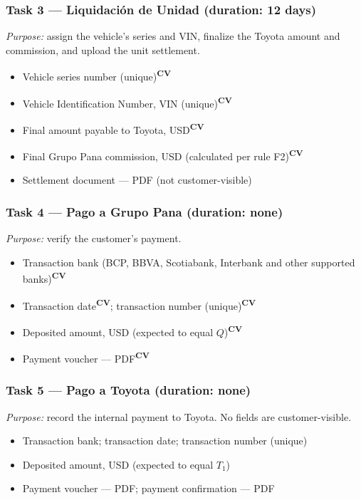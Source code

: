 \documentclass[11pt,a4paper]{article}
\newcommand{\cv}{\textsuperscript{\textcolor{panablue}{\textbf{CV}}}}
\begin{document}
\subsubsection*{Task 3 --- Liquidación de Unidad (duration: 12 days)}
\textit{Purpose:} assign the vehicle's series and VIN, finalize the Toyota
amount and commission, and upload the unit settlement.
\begin{itemize}
	\item Vehicle series number (unique)\cv{}
	\item Vehicle Identification Number, VIN (unique)\cv{}
	\item Final amount payable to Toyota, USD\cv{}
	\item Final Grupo Pana commission, USD (calculated per rule F2)\cv{}
	\item Settlement document --- PDF (not customer-visible)
\end{itemize}

\subsubsection*{Task 4 --- Pago a Grupo Pana (duration: none)}
\textit{Purpose:} verify the customer's payment.
\begin{itemize}
	\item Transaction bank (BCP, BBVA, Scotiabank, Interbank and other supported
	      banks)\cv{}
	\item Transaction date\cv{}; transaction number (unique)\cv{}
	\item Deposited amount, USD (expected to equal $Q$)\cv{}
	\item Payment voucher --- PDF\cv{}
\end{itemize}

\subsubsection*{Task 5 --- Pago a Toyota (duration: none)}
\textit{Purpose:} record the internal payment to Toyota. No fields are
customer-visible.
\begin{itemize}
	\item Transaction bank; transaction date; transaction number (unique)
	\item Deposited amount, USD (expected to equal $T_1$)
	\item Payment voucher --- PDF; payment confirmation --- PDF
\end{itemize}
\end{document}
